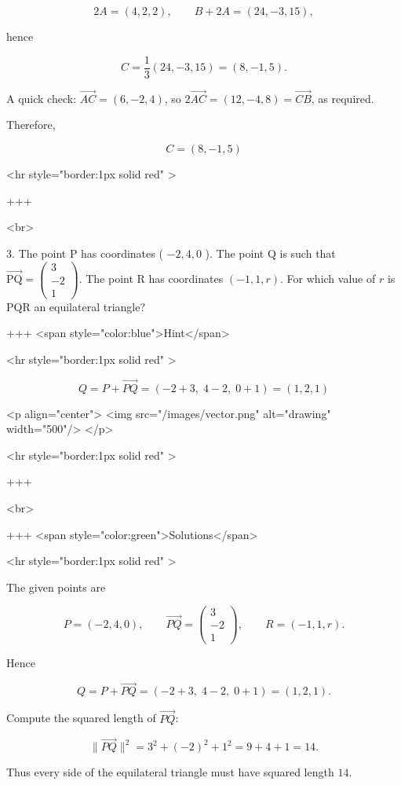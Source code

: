 $$
2A=(4,2,2),\qquad B+2A=(24,-3,15),
$$

hence

$$
C=\frac{1}{3}(24,-3,15)=(8,-1,5).
$$


A quick check: $\overrightarrow{AC}=(6,-2,4)$, so $2\overrightarrow{AC}=(12,-4,8)=\overrightarrow{CB}$, as required.

Therefore,

$$
C=(8,-1,5)
$$

<hr style="border:1px solid red" >

+++

<br>

3. The point P has coordinates ( $-2,4,0$ ).
The point Q is such that $\overrightarrow{\mathrm{PQ}}=\left(\begin{array}{c}3 \\ -2 \\ 1\end{array}\right)$.
The point R has coordinates $(-1,1, r)$.
For which value of $r$ is PQR an equilateral triangle?

+++ <span style="color:blue">Hint</span>

<hr style="border:1px solid red" >

$$
Q=P+\overrightarrow{PQ}=( -2+3,\;4-2,\;0+1)=(1,2,1)
$$

<p align="center">
<img src="/images/vector.png" alt="drawing" width="500"/>
</p>

<hr style="border:1px solid red" >

+++

<br>

+++ <span style="color:green">Solutions</span>

<hr style="border:1px solid red" >

The given points are

$$
P=(-2,4,0),\qquad \overrightarrow{PQ}=\begin{pmatrix}3\\-2\\1\end{pmatrix},
\qquad R=(-1,1,r).
$$

Hence

$$
Q=P+\overrightarrow{PQ}=( -2+3,\;4-2,\;0+1)=(1,2,1).
$$


Compute the squared length of $\overrightarrow{PQ}$:

$$
\lVert\overrightarrow{PQ}\rVert^2=3^2+(-2)^2+1^2=9+4+1=14.
$$

Thus every side of the equilateral triangle must have squared length $14$.

